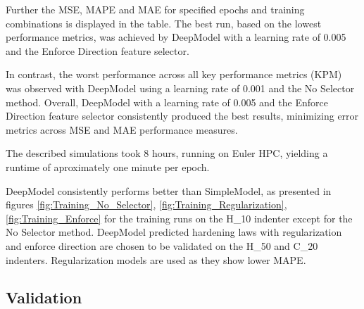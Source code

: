 Further the MSE, MAPE and MAE for specified epochs and training combinations is displayed in the table.  The best run, based on the lowest performance metrics, was achieved by DeepModel with a learning rate of 0.005 and the Enforce Direction feature selector.

In contrast, the worst performance across all key performance metrics (KPM) was observed with DeepModel using a learning rate of 0.001 and the No Selector method. Overall, DeepModel with a learning rate of 0.005 and the Enforce Direction feature selector consistently produced the best results, minimizing error metrics across MSE and MAE performance measures.

The described simulations took 8 hours, running on Euler HPC, yielding a runtime of aproximately one minute per epoch.

DeepModel consistently performs better than SimpleModel, as presented in figures
\ref{fig:Training_No_Selector},
\ref{fig:Training_Regularization},
\ref{fig:Training_Enforce}
for the training runs on the H\_10 indenter except for the No Selector method. DeepModel predicted hardening laws with regularization and enforce direction are chosen to be validated on the H\_50 and C\_20 indenters. Regularization models are used as they show lower MAPE.

\subsection{Validation}


